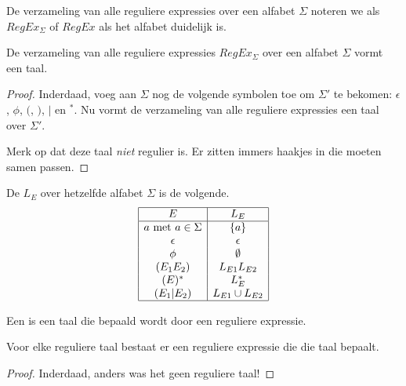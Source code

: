 \documentclass[main.tex]{subfiles}
\begin{document}
\begin{de}
  De verzameling van alle reguliere expressies over een alfabet $\Sigma$ noteren we als $RegEx_{\Sigma}$ of $RegEx$ als het alfabet duidelijk is.
\end{de}

\begin{st}
  De verzameling van alle reguliere expressies $RegEx_{\Sigma}$ over een alfabet $\Sigma$ vormt een taal.

  \begin{proof}
    Inderdaad, voeg aan $\Sigma$ nog de volgende symbolen toe om $\Sigma'$ te bekomen: $\epsilon$, $\phi$, $($, $)$, $|$ en $^{*}$.
    Nu vormt de verzameling van alle reguliere expressies een taal over $\Sigma'$.

    Merk op dat deze taal \emph{niet} regulier is. Er zitten immers haakjes in die moeten samen passen. 
  \end{proof}
\end{st}

\begin{de}
  \label{def:taal-bepaald-door-regex}
  De  $L_E$ over hetzelfde alfabet $\Sigma$ is de volgende.
  \[
  \begin{array}{|c|c|}
    \hline
    E                           & L_E\\
    \hline
    a \text{ met } a \in \Sigma & \{a\}\\
    \epsilon                    & {\epsilon}\\
    \phi                        & \emptyset\\
    (E_1E_2)                    & L_{E1}L_{E2}\\
    (E)^{*}                      & L_E^*\\
    (E_1|E_2)                   & L_{E1} \cup L_{E2}\\
    \hline
  \end{array}
  \]
\end{de}

\begin{de}
  \label{de:reguliere-taal}
  Een  is een taal die bepaald wordt door een reguliere expressie.
\end{de}

\begin{ei}
  \label{ei:reguliere-taal-expressie}
  Voor elke reguliere taal bestaat er een reguliere expressie die die taal bepaalt.

  \begin{proof}
    Inderdaad, anders was het geen reguliere taal! 
  \end{proof}
\end{ei}
\end{document}
